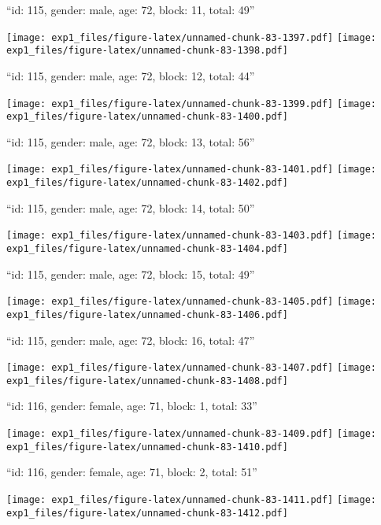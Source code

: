 \documentclass[11pt,,]{article}
\begin{document}
\newpage
[1] 

``id: 115, gender: male, age: 72, block: 11, total: 49''

\texttt{[image: exp1\_files/figure-latex/unnamed-chunk-83-1397.pdf]}
\texttt{[image: exp1\_files/figure-latex/unnamed-chunk-83-1398.pdf]}

\newpage
[1] 

``id: 115, gender: male, age: 72, block: 12, total: 44''

\texttt{[image: exp1\_files/figure-latex/unnamed-chunk-83-1399.pdf]}
\texttt{[image: exp1\_files/figure-latex/unnamed-chunk-83-1400.pdf]}

\newpage
[1] 

``id: 115, gender: male, age: 72, block: 13, total: 56''

\texttt{[image: exp1\_files/figure-latex/unnamed-chunk-83-1401.pdf]}
\texttt{[image: exp1\_files/figure-latex/unnamed-chunk-83-1402.pdf]}

\newpage
[1] 

``id: 115, gender: male, age: 72, block: 14, total: 50''

\texttt{[image: exp1\_files/figure-latex/unnamed-chunk-83-1403.pdf]}
\texttt{[image: exp1\_files/figure-latex/unnamed-chunk-83-1404.pdf]}

\newpage
[1] 

``id: 115, gender: male, age: 72, block: 15, total: 49''

\texttt{[image: exp1\_files/figure-latex/unnamed-chunk-83-1405.pdf]}
\texttt{[image: exp1\_files/figure-latex/unnamed-chunk-83-1406.pdf]}

\newpage
[1] 

``id: 115, gender: male, age: 72, block: 16, total: 47''

\texttt{[image: exp1\_files/figure-latex/unnamed-chunk-83-1407.pdf]}
\texttt{[image: exp1\_files/figure-latex/unnamed-chunk-83-1408.pdf]}

\newpage
[1] 

``id: 116, gender: female, age: 71, block: 1, total: 33''

\texttt{[image: exp1\_files/figure-latex/unnamed-chunk-83-1409.pdf]}
\texttt{[image: exp1\_files/figure-latex/unnamed-chunk-83-1410.pdf]}

\newpage
[1] 

``id: 116, gender: female, age: 71, block: 2, total: 51''

\texttt{[image: exp1\_files/figure-latex/unnamed-chunk-83-1411.pdf]}
\texttt{[image: exp1\_files/figure-latex/unnamed-chunk-83-1412.pdf]}
\end{document}
